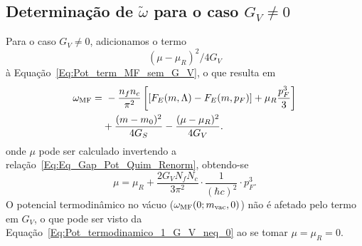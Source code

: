 %
%
%
%

\subsection{Determinação de $\tilde\omega$ para o caso $G_V \neq 0$}

Para o caso $G_V \neq 0$, adicionamos o termo 
\begin{equation}
	(\mu-\mu_R)^2 / 4G_V
\end{equation}
%
à Equação~\eqref{Eq:Pot_term_MF_sem_G_V}, o que resulta em 
\begin{equation}\label{Eq:Pot_termodinamico_1_G_V_neq_0}
\begin{split}
\omega_{\rm{MF}} =&~ - \frac{n_f n_c}{\pi^2} \left[[F_E(m,\Lambda) - F_E(m, p_F)] + \mu_R \frac{p_F^3}{3} \right] \\
&+ \frac{(m-m_0)^2}{4G_S} - \frac{(\mu - \mu_R)^2}{4G_V}.
\end{split}
\end{equation}
%
onde $\mu$ pode ser calculado invertendo a relação~\eqref{Eq:Eq_Gap_Pot_Quim_Renorm}, obtendo-se
\begin{equation}
	\mu = \mu_R + \frac{2G_V N_fN_c}{3\pi^2} \cdot \frac{1}{(\hbar c)^2} \cdot p_F^3.
\end{equation}
%
O potencial termodinâmico no vácuo ($\omega_{\rm{MF}}(0; m_{\rm{vac}}, 0)$) não é afetado pelo termo em $G_V$, o que pode ser visto da Equação~\eqref{Eq:Pot_termodinamico_1_G_V_neq_0} ao se tomar $\mu = \mu_R = 0$.

